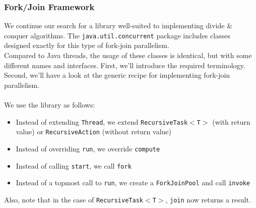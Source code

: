 \documentclass[main.tex]{subfiles}
\begin{document}
\subsubsection{Fork/Join Framework} \label{Fork/Join Framework}
We continue our search for a library well-suited to implementing divide \& conquer algorithms. The \texttt{java.util.concurrent} package includes classes designed exactly for this type of fork-join parallelism.\\
Compared to Java threads, the usage of these classes is identical, but with some different names and interfaces. First, we'll introduce the required terminology. Second, we'll have a look at the generic recipe for implementing fork-join parallelism.\\
\\
We use the library as follows:
\begin{itemize}
    \item Instead of extending \texttt{Thread}, we extend \texttt{RecursiveTask$<$T$>$} (with return value) or \texttt{RecursiveAction} (without return value)
    \item Instead of overriding \texttt{run}, we override \texttt{compute}
    \item Instead of calling \texttt{start}, we call \texttt{fork}
    \item Instead of a topmost call to \texttt{run}, we create a \texttt{ForkJoinPool} and call \texttt{invoke}
\end{itemize}
Also, note that in the case of \texttt{RecursiveTask$<$T$>$}, \texttt{join} now returns a result.\\
\end{document}
